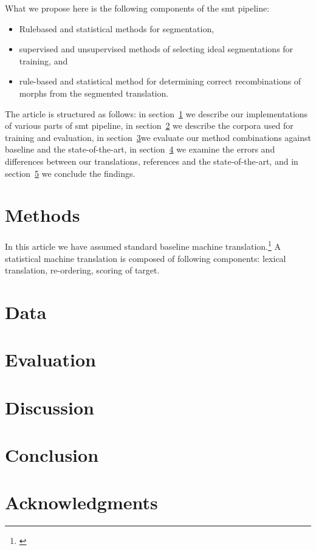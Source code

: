 \documentclass[11pt,letterpaper]{article}
\begin{document}
What we propose here is the following components of the smt pipeline:

\begin{itemize}
    \item Rulebased and statistical methods for segmentation,
    \item supervised and unsupervised methods of selecting ideal segmentations
        for training, and
    \item rule-based and statistical method for determining correct
        recombinations of morphs from the segmented translation.
\end{itemize}

The article is structured as follows: in section~\ref{sec:methods} we describe
our implementations of various parts of smt pipeline, in section~\ref{sec:data}
we describe the corpora used for training and evaluation, in
section~\ref{sec:evaluation}we evaluate our method combinations against
baseline and the state-of-the-art, in section~\ref{sec:discussion} we examine
the errors and differences between our translations, references and the
state-of-the-art, and in section~\ref{sec:conclusion} we conclude the
findings.

\section{Methods}
\label{sec:methods}

In this article we have assumed standard baseline machine 
translation.\footnote{\url{}} 
A statistical machine translation is composed of following components:
lexical translation, re-ordering, scoring of target. 

\section{Data}
\label{sec:data}

\section{Evaluation}
\label{sec:evaluation}

\section{Discussion}
\label{sec:discussion}

\section{Conclusion}
\label{sec:conclusion}

\section*{Acknowledgments}




\end{document}
